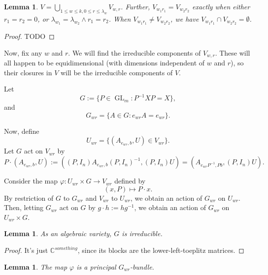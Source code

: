 \documentclass[12pt,psamsfonts]{article}
\DeclareMathOperator{\GL}{GL}
\newtheorem{lemma}[theorem]{Lemma}
\begin{document}
\begin{lemma}
    \(V = \bigcup_{1 \leq w \leq k, 0 \leq r \leq \lambda_{w}} V_{w,r}\).
    Further, \(V_{w_1r_1} = V_{w_2r_2}\) exactly when either \(r_1 = r_2 = 0\), or \(\lambda_{w_1} = \lambda_{w_2} \land r_1 = r_2\).
    When \(V_{w_1r_1} \neq V_{w_2r_2}\), we have \(V_{w_1r_1} \cap V_{w_2r_2} = \emptyset\).
\end{lemma}
\begin{proof}
    TODO
\end{proof}
Now, fix any \(w\) and \(r\).
We will find the irreducible components of \(V_{w,r}\).
These will all happen to be equidimensional (with dimensions independent of \(w\) and \(r\)), so their closures in \(V\) will be the irreducible components of \(V\).
\par Let 
\[G := \{P \in \GL_m : P^{-1} X P = X\},\]
and
\[G_{wr} = \{A \in G : e_{wr}A = e_{wr}\}.\]
\par Now, define 
\[U_{wr} = \{(A_{e_{wr}, b}, U) \in V_{wr}\}.\]
Let \(G\) act on \(V_{wr}\) by
\[P \cdot (A_{e_{wr},b}, U) := ((P, I_n) A_{e_{wr}, b} (P, I_n)^{-1}, (P, I_n)U) = (A_{e_{wr} P^{-1}, Pb}, (P, I_n) U).\]
\par Consider the map \(\varphi : U_{wr} \times G \to V_{wr}\) defined by
\[(x, P) \mapsto P \cdot x.\]
By restriction of \(G\) to \(G_{wr}\) and \(V_{wr}\) to \(U_{wr}\), we obtain an action of \(G_{wr}\) on \(U_{wr}\).
Then, letting \(G_{wr}\) act on \(G\) by \(g \cdot h := hg^{-1}\), we obtain an action of \(G_{wr}\) on \(U_{wr} \times G\).
\begin{lemma}
    As an algebraic variety, \(G\) is irreducible.
\end{lemma}
\begin{proof}
    It's just \(\mathbb{C}^{something}\), since its blocks are the lower-left-toeplitz matrices.
\end{proof}
\begin{lemma}
    The map \(\varphi\) is a principal \(G_{wr}\)-bundle.
\end{lemma}
\end{document}
